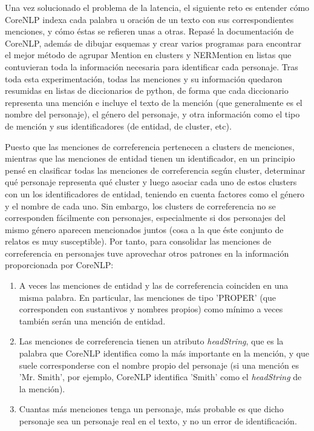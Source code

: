 \documentclass{pre-tfg}
\begin{document}
Una vez solucionado el problema de la latencia, el siguiente reto es entender cómo CoreNLP indexa cada palabra u oración de un texto con sus correspondientes menciones, y cómo éstas se refieren unas a otras. Repasé la documentación de CoreNLP, además de dibujar esquemas y crear varios programas para encontrar el mejor método de agrupar Mention en clusters y NERMention en listas que contuvieran toda la información necesaria para identificar cada personaje. Tras toda esta experimentación, todas las menciones y su información quedaron resumidas en listas de diccionarios de python, de forma que cada diccionario representa una mención e incluye el texto de la mención (que generalmente es el nombre del personaje), el género del personaje, y otra información como el tipo de mención y sus identificadores (de entidad, de cluster, etc).


Puesto que las menciones de correferencia pertenecen a clusters de menciones, mientras que las menciones de entidad tienen un identificador, en un principio pensé en clasificar todas las menciones de correferencia según cluster, determinar qué personaje representa qué cluster y luego asociar cada uno de estos clusters con un los identificadores de entidad, teniendo en cuenta factores como el género y el  nombre de cada uno.
Sin embargo, los clusters de correferencia no se corresponden fácilmente con personajes, especialmente si dos personajes del mismo género aparecen mencionados juntos (cosa a la que éste conjunto de relatos es muy susceptible). Por tanto, para consolidar las menciones de correferencia en personajes tuve aprovechar otros patrones en la información proporcionada por CoreNLP:

\begin{enumerate}
	\item A veces las menciones de entidad y las de correferencia coinciden en una misma palabra. En particular, las menciones de tipo 'PROPER' (que corresponden con sustantivos y nombres propios) como mínimo a veces también serán una mención de entidad.
	\item Las menciones de correferencia tienen un atributo \textit{headString}, que es la palabra que CoreNLP identifica como la más importante en la mención, y que suele corresponderse con el nombre propio del personaje (si una mención es 'Mr. Smith', por ejemplo, CoreNLP identifica 'Smith' como el \textit{headString} de la mención).
	\item Cuantas más menciones tenga un personaje, más probable es que dicho personaje sea un personaje real en el texto, y no un error de identificación.
\end{enumerate}
\end{document}
